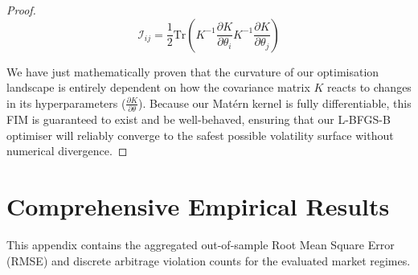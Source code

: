 \documentclass[12pt,oneside]{report}
\theoremstyle{definition}
\theoremstyle{remark}
\begin{document}
\begin{proof}
$$\mathcal{I}_{ij} = \frac{1}{2} \text{Tr} \left( K^{-1} \frac{\partial K}{\partial \theta_i} K^{-1} \frac{\partial K}{\partial \theta_j} \right)$$

We have just mathematically proven that the curvature of our optimisation landscape is entirely dependent on how the covariance matrix $K$ reacts to changes in its hyperparameters ($\frac{\partial K}{\partial \theta}$). Because our Matérn kernel is fully differentiable, this FIM is guaranteed to exist and be well-behaved, ensuring that our L-BFGS-B optimiser will reliably converge to the safest possible volatility surface without numerical divergence.

\end{proof}

\newpage
\chapter{Comprehensive Empirical Results}

This appendix contains the aggregated out-of-sample Root Mean Square Error (RMSE) and discrete arbitrage violation counts for the evaluated market regimes.
\end{document}
